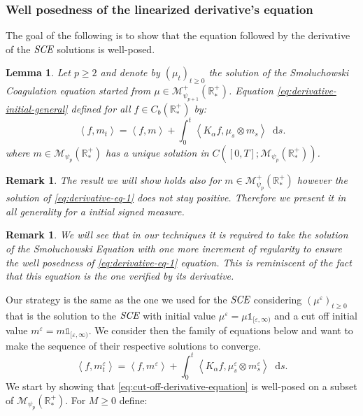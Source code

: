 \documentclass[11pt,a4paper]{article}
\newcommand{\RR}{\mathbb{R}}
\newcommand{\RRP}{\mathbb{R}^+_*}
\newcommand{\MC}{\mathcal{M}}
\newcommand{\SCE}{\emph{SCE}}
\newcommand{\Proc}[1]{\left(#1\right)_{t\geq 0}}
\newcommand{\brac}[1]{\left\langle#1\right\rangle}
\newcommand{\dd}{\mathop{}\!\mathrm{d}}
\newtheorem{lemma}[theorem]{Lemma}
\newtheorem{remark}[theorem]{Remark}
\begin{document}
\subsubsection{Well posedness of the linearized derivative's equation}
The goal of the following is to show that the equation followed by the derivative of the $\SCE$ solutions is well-posed.
\begin{lemma}\label{lem:well_posedness_derivative_eq}
    Let $p \geq 2$ and denote by $\Proc{\mu_t}$ the solution of the Smoluchowski Coagulation equation started from $\mu \in \MC^+_{\psi_{p + 1}}\left(\RRP\right)$. Equation \eqref{eq:derivative-initial-general} defined for all $f \in C_b(\RR^+_*)$ by:
    \begin{equation}\label{eq:derivative-eq-1}
        \brac{f,m_t} = \brac{f,m} + \int_0^t \brac{K_\alpha f,\mu_s\otimes m_s} \dd s.
    \end{equation}
    where $m \in \MC_{\psi_p}\left(\RRP\right)$ has a unique solution in $C\left([0,T];\MC_{\psi_p}\left(\RRP\right)\right)$.
\end{lemma}
\begin{remark}
    The result we will show holds also for $m \in \MC^+_{\psi_p}\left(\RRP\right) $ however the solution of \eqref{eq:derivative-eq-1} does not stay positive. Therefore we present it in all generality for a initial signed measure.
\end{remark}
\begin{remark}
    We will see that in our techniques it is required to take the solution of the Smoluchowski Equation with one more increment of regularity to ensure the well posedness of \eqref{eq:derivative-eq-1} equation. This is reminiscent of the fact that this equation is the one verified by its derivative.
\end{remark}
Our strategy is the same as the one we used for the $\SCE$ considering $\Proc{\mu^\varepsilon}$ that is the solution to the $\SCE$ with initial value $\mu^\varepsilon = \mu\mathds{1}_{[\varepsilon,\infty)}$ and a cut off initial value $m^\varepsilon = m\mathds{1}_{[\varepsilon,\infty)}$. We consider then the family of equations below and want to make the sequence of their respective solutions to converge.
\begin{equation}\label{eq:cut-off-derivative-equation}
    \brac{f,m^\varepsilon_t} = \brac{f,m^\varepsilon} + \int_0^t \brac{K_\alpha f,\mu^\varepsilon_s\otimes m^\varepsilon_s} \dd s.
\end{equation}
We start by showing that \eqref{eq:cut-off-derivative-equation} is well-posed on a subset of $\MC_{\psi_p}\left(\RRP\right)$. For $M \geq 0$ define:
\end{document}
